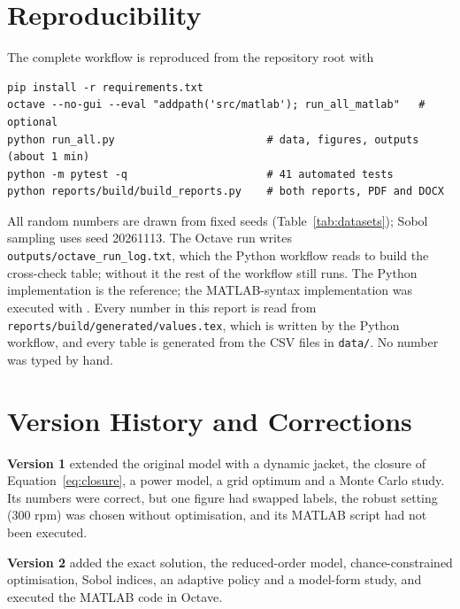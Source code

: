 \documentclass[11pt,letterpaper]{article}
\begin{document}
\section{Reproducibility}\label{app:repro}

The complete workflow is reproduced from the repository root with
\begin{verbatim}
pip install -r requirements.txt
octave --no-gui --eval "addpath('src/matlab'); run_all_matlab"   # optional
python run_all.py                        # data, figures, outputs (about 1 min)
python -m pytest -q                      # 41 automated tests
python reports/build/build_reports.py    # both reports, PDF and DOCX
\end{verbatim}
All random numbers are drawn from fixed seeds (Table~\ref{tab:datasets}); Sobol sampling uses seed 20261113. The Octave run writes \texttt{outputs/octave\_run\_log.txt}, which the Python workflow reads to build the cross-check table; without it the rest of the workflow still runs. The Python implementation is the reference; the MATLAB-syntax implementation was executed with \vOctRuntime. Every number in this report is read from \nolinkurl{reports/build/generated/values.tex}, which is written by the Python workflow, and every table is generated from the CSV files in \texttt{data/}. No number was typed by hand.

\section{Version History and Corrections}

\textbf{Version 1} extended the original model with a dynamic jacket, the closure of Equation~\ref{eq:closure}, a power model, a grid optimum and a Monte Carlo study. Its numbers were correct, but one figure had swapped labels, the robust setting (300 rpm) was chosen without optimisation, and its MATLAB script had not been executed.

\textbf{Version 2} added the exact solution, the reduced-order model, chance-constrained optimisation, Sobol indices, an adaptive policy and a model-form study, and executed the MATLAB code in Octave.
\end{document}
